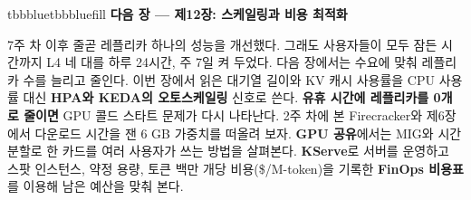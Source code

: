 \begin{calloutbox}{tbbblue}{tbbbluefill}
{\normalsize\bfseries\color{tbbblue}다음 장 — 제12장: 스케일링과 비용 최적화}\par\vspace{3pt}
7주 차 이후 줄곧 레플리카 하나의 성능을 개선했다. 그래도 사용자들이 모두 잠든 시간까지 L4 네 대를 하루 24시간, 주 7일 켜 두었다. 다음 장에서는 수요에 맞춰 레플리카 수를 늘리고 줄인다. 이번 장에서 읽은 대기열 길이와 KV 캐시 사용률을 CPU 사용률 대신 \textbf{HPA와 KEDA의 오토스케일링} 신호로 쓴다. \textbf{유휴 시간에 레플리카를 0개로 줄이면} GPU 콜드 스타트 문제가 다시 나타난다. 2주 차에 본 Firecracker와 제6장에서 다운로드 시간을 잰 6 GB 가중치를 떠올려 보자. \textbf{GPU 공유}에서는 MIG와 시간 분할로 한 카드를 여러 사용자가 쓰는 방법을 살펴본다. \textbf{KServe}로 서버를 운영하고 스팟 인스턴스, 약정 용량, 토큰 백만 개당 비용(\$/M-token)을 기록한 \textbf{FinOps 비용표}를 이용해 남은 예산을 맞춰 본다.
\end{calloutbox}
